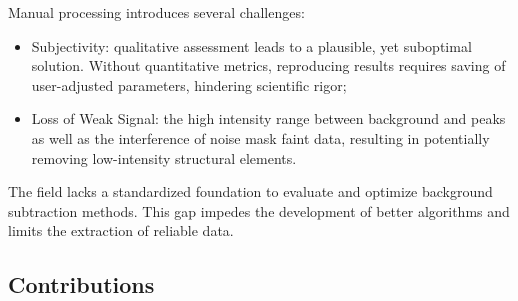 \documentclass[iucr,review]{iucrjournals}
\begin{document}
Manual processing introduces several challenges: 
\begin{itemize}
        \item Subjectivity: qualitative assessment leads to a plausible, yet suboptimal solution.
        Without quantitative metrics, reproducing results requires saving of user-adjusted parameters, hindering scientific rigor;
        \item Loss of Weak Signal: the high intensity range between background and peaks as well as the interference of noise mask faint data, resulting in potentially removing low-intensity structural elements.  
\end{itemize}


The field lacks a standardized foundation to evaluate and optimize background subtraction methods.
This gap impedes the development of better algorithms and limits the extraction of reliable data.

\subsection{Contributions}
\end{document}
